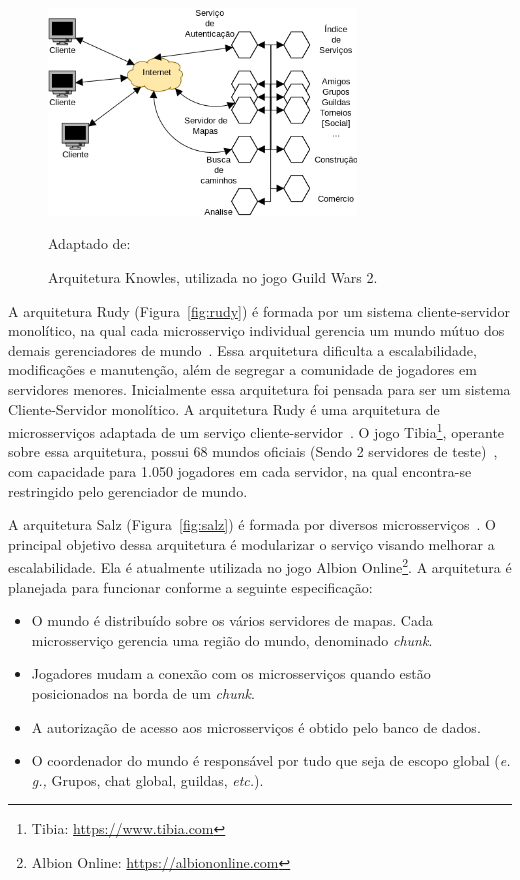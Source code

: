 \begin{figure}[htb!]
  \caption{Arquitetura Knowles, utilizada no jogo Guild Wars 2.}
  \label{fig:knowles}
  \includegraphics[height=5.5cm]{arquiteturas/knowles.png}
  \centering

  Adaptado de:~\cite{stephenclarkewillson2017}
\end{figure}

A arquitetura Rudy (Figura~\ref{fig:rudy}) é formada por um sistema cliente-servidor monolítico, na qual cada microsserviço individual gerencia um mundo mútuo dos demais gerenciadores de mundo~\cite{matthiasrudy2011}.
%
Essa arquitetura dificulta a escalabilidade, modificações e manutenção\cite{8169955}, além de segregar a comunidade de jogadores em servidores menores\cite{matthiasrudy2011}.
%
Inicialmente essa arquitetura foi pensada para ser um sistema Cliente-Servidor monolítico.
%
A arquitetura Rudy é uma arquitetura de microsserviços adaptada de um serviço cliente-servidor~\cite{matthiasrudy2011}.
%
O jogo Tibia\footnote[1]{Tibia: \url{https://www.tibia.com}}, operante sobre essa arquitetura, possui 68 mundos oficiais (Sendo 2 servidores de teste)~\cite{matthiasrudy2011}, com capacidade para 1.050 jogadores em cada servidor, na qual encontra-se restringido pelo gerenciador de mundo.



A arquitetura Salz (Figura~\ref{fig:salz}) é formada por diversos microsserviços~\cite{albion_online_unite}.
%
O principal objetivo dessa arquitetura é modularizar o serviço visando melhorar a escalabilidade.
%
Ela é atualmente utilizada no jogo Albion Online\footnote[2]{Albion Online: \url{https://albiononline.com}}.
%
A arquitetura é planejada para funcionar conforme a seguinte especificação\cite{albion_online_unite}:

\begin{itemize}
  \item O mundo é distribuído sobre os vários servidores de mapas. Cada microsserviço gerencia uma região do mundo, denominado \textit{chunk}.
  \item Jogadores mudam a conexão com os microsserviços quando estão posicionados na borda de um \textit{chunk}.
  \item A autorização de acesso aos microsserviços é obtido pelo banco de dados.
  \item O coordenador do mundo é responsável por tudo que seja de escopo global (\textit{e. g.,} Grupos, chat global, guildas, \textit{etc.}).
\end{itemize}


